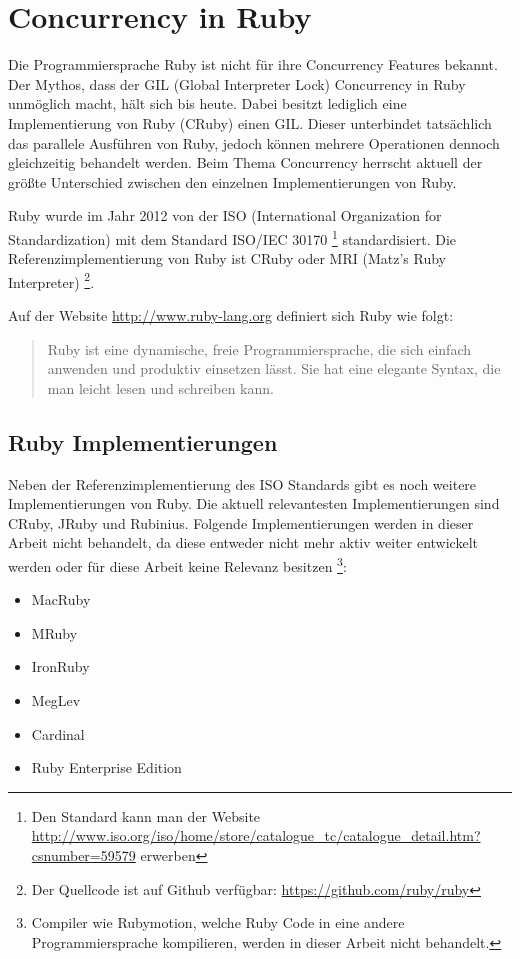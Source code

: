 \section{Concurrency in Ruby}
\label{section: Ruby}

Die Programmiersprache Ruby ist nicht für ihre Concurrency Features bekannt. Der Mythos, dass der GIL (Global Interpreter Lock) Concurrency in Ruby unmöglich macht, hält sich bis heute. Dabei besitzt lediglich eine Implementierung von Ruby (CRuby) einen GIL. Dieser unterbindet tatsächlich das parallele Ausführen von Ruby, jedoch können mehrere Operationen dennoch gleichzeitig behandelt werden. Beim Thema Concurrency herrscht aktuell der größte Unterschied zwischen den einzelnen Implementierungen von Ruby.

Ruby wurde im Jahr 2012 von der ISO (International Organization for Standardization) mit dem Standard ISO/IEC 30170 \footnote{Den Standard kann man der Website \url{http://www.iso.org/iso/home/store/catalogue_tc/catalogue_detail.htm?csnumber=59579} erwerben} standardisiert. Die Referenzimplementierung von Ruby ist CRuby oder MRI (Matz's Ruby Interpreter) \footnote{Der Quellcode ist auf Github verfügbar: \url{https://github.com/ruby/ruby}}.

Auf der Website \url{http://www.ruby-lang.org} definiert sich Ruby wie folgt:

\begin{quote}
  Ruby ist eine dynamische, freie Programmiersprache, die sich einfach anwenden und produktiv einsetzen lässt. Sie hat eine elegante Syntax, die man leicht lesen und schreiben kann.
\end{quote}

\subsection{Ruby Implementierungen}

Neben der Referenzimplementierung des ISO Standards gibt es noch weitere Implementierungen von Ruby. Die aktuell relevantesten Implementierungen sind CRuby, JRuby und Rubinius. Folgende Implementierungen werden in dieser Arbeit nicht behandelt, da diese entweder nicht mehr aktiv weiter entwickelt werden oder für diese Arbeit keine Relevanz besitzen 
\footnote{Compiler wie Rubymotion, welche Ruby Code in eine andere Programmiersprache kompilieren, werden in dieser Arbeit nicht behandelt.}:

\begin{itemize}
  \item MacRuby
  \item MRuby
  \item IronRuby
  \item MegLev
  \item Cardinal
  \item Ruby Enterprise Edition
\end{itemize}


